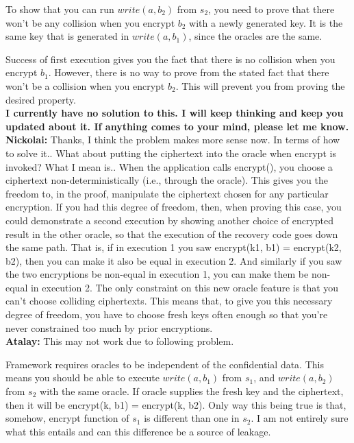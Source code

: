 \documentclass[onecolumn]{paper}
\begin{document}
		To show that you can run $write(a, b_2)$ from $s_2$, you need to prove that there won't be any collision when you encrypt $b_2$ with a newly generated key. It is the same key that is generated in $write(a, b_1)$, since the oracles are the same.
		
		Success of first execution gives you the fact that there is no collision when you encrypt $b_1$. However, there is no way to prove from the stated fact that there won't be a collision when you encrypt $b_2$. This will prevent you from proving the desired property.\\
		
		{\bf I currently have no solution to this. I will keep thinking and keep you updated about it. If anything comes to your mind, please let me know.}\\
		 
		{\color{red} \bf Nickolai:} Thanks, I think the problem makes more sense now.
		In terms of how to solve it..  What about putting the ciphertext into the oracle when encrypt is invoked?
		What I mean is..  When the application calls encrypt(), you choose a ciphertext non-deterministically (i.e., through the oracle).  This gives you the freedom to, in the proof, manipulate the ciphertext chosen for any particular encryption.
		If you had this degree of freedom, then, when proving this case, you could demonstrate a second execution by showing another choice of encrypted result in the other oracle, so that the execution of the recovery code goes down the same path.
		That is, if in execution 1 you saw encrypt(k1, b1) = encrypt(k2, b2), then you can make it also be equal in execution 2.
		And similarly if you saw the two encryptions be non-equal in execution 1, you can make them be non-equal in execution 2.
		The only constraint on this new oracle feature is that you can't choose colliding ciphertexts.
		This means that, to give you this necessary degree of freedom, you have to choose fresh keys often enough so that you're never constrained too much by prior encryptions.\\
		
		{\color{blue} \bf Atalay:} This may not work due to following problem.
		
		Framework requires oracles to be independent of the confidential data. This means you should be able to execute $write(a, b_1)$ from $s_1$, and $write(a, b_2)$ from $s_2$ with the same oracle. If oracle supplies the fresh key and the ciphertext, then it will be encrypt(k, b1) = encrypt(k, b2). Only way this being true is that, somehow, encrypt function of $s_1$ is different than one in $s_2$. I am not entirely sure what this entails and can this difference be a source of leakage.
		
\end{document}
